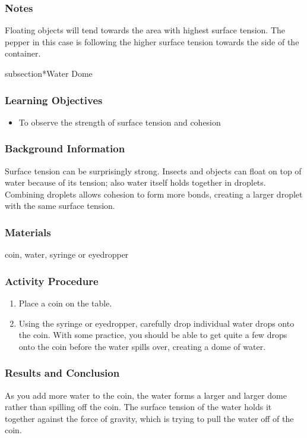 \subsubsection*{Notes}
Floating objects will tend towards the area with highest surface tension. The pepper in this case is following the higher surface tension towards the side of the container.

subsection*{Water Dome}

\subsubsection*{Learning Objectives}
\begin{itemize}
\item{To observe the strength of surface tension and cohesion}
\end{itemize}

\subsubsection*{Background Information}
Surface tension can be surprisingly strong. Insects and objects can float on top of water because of its tension; also water itself holds together in droplets. Combining droplets allows cohesion to form more bonds, creating a larger droplet with the same surface tension.

\subsubsection*{Materials}
coin, water, syringe or eyedropper

\subsubsection*{Activity Procedure}
\begin{enumerate}
\item{Place a coin on the table.}
\item{Using the syringe or eyedropper, carefully drop individual water drops onto the coin. With some practice, you should be able to get quite a few drops onto the coin before the water spills over, creating a dome of water.}
\end{enumerate}

\subsubsection*{Results and Conclusion}
As you add more water to the coin, the water forms a larger and larger dome rather than spilling off the coin. The surface tension of the water holds it together against the force of gravity, which is trying to pull the water off of the coin. 

